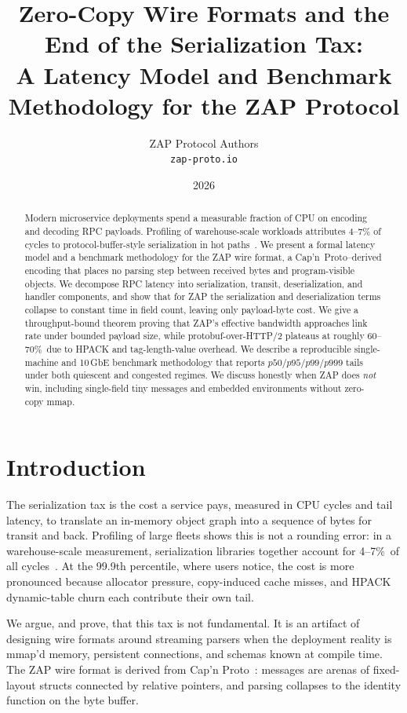 \documentclass[11pt]{article}
\title{Zero-Copy Wire Formats and the End of the Serialization Tax:\\
A Latency Model and Benchmark Methodology for the ZAP Protocol}
\author{ZAP Protocol Authors\\\texttt{zap-proto.io}}
\date{2026}
\theoremstyle{definition}
\theoremstyle{remark}
\begin{document}
\maketitle

\begin{abstract}
Modern microservice deployments spend a measurable fraction of CPU
on encoding and decoding RPC payloads. Profiling of warehouse-scale
workloads attributes 4--7\% of cycles to protocol-buffer-style
serialization in hot paths~\cite{kanev2015profiling}.
We present a formal latency model and a benchmark methodology for the
ZAP wire format, a Cap'n~Proto--derived encoding that places no
parsing step between received bytes and program-visible objects.
We decompose RPC latency into serialization, transit, deserialization,
and handler components, and show that for ZAP the serialization and
deserialization terms collapse to constant time in field count, leaving
only payload-byte cost. We give a throughput-bound theorem proving that
ZAP's effective bandwidth approaches link rate under bounded payload
size, while protobuf-over-HTTP/2 plateaus at roughly 60--70\%\ due to
HPACK and tag-length-value overhead. We describe a reproducible
single-machine and 10\,GbE benchmark methodology that reports
$p50/p95/p99/p999$ tails under both quiescent and congested regimes.
We discuss honestly when ZAP does \emph{not} win, including
single-field tiny messages and embedded environments without
zero-copy mmap.
\end{abstract}

\section{Introduction}
\label{sec:intro}

The serialization tax is the cost a service pays, measured in CPU
cycles and tail latency, to translate an in-memory object graph into a
sequence of bytes for transit and back. Profiling of large fleets shows
this is not a rounding error: in a warehouse-scale measurement,
serialization libraries together account for 4--7\%\ of all
cycles~\cite{kanev2015profiling}. At the 99.9th percentile, where users
notice, the cost is more pronounced because allocator pressure,
copy-induced cache misses, and HPACK dynamic-table churn each
contribute their own tail.

We argue, and prove, that this tax is not fundamental. It is an
artifact of designing wire formats around streaming parsers when the
deployment reality is mmap'd memory, persistent connections, and
schemas known at compile time. The ZAP wire format is derived from
Cap'n Proto~\cite{capnproto,capnproto-encoding}: messages are arenas
of fixed-layout structs connected by relative pointers, and parsing
collapses to the identity function on the byte buffer.
\end{document}
